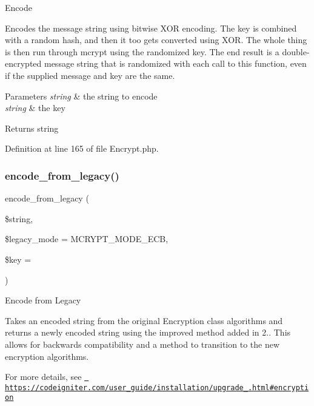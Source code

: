 Encode

Encodes the message string using bitwise X\+OR encoding. The key is combined with a random hash, and then it too gets converted using X\+OR. The whole thing is then run through mcrypt using the randomized key. The end result is a double-\/encrypted message string that is randomized with each call to this function, even if the supplied message and key are the same.


\begin{DoxyParams}{Parameters}
{\em string} & the string to encode \\
\hline
{\em string} & the key \\
\hline
\end{DoxyParams}
\begin{DoxyReturn}{Returns}
string 
\end{DoxyReturn}


Definition at line 165 of file Encrypt.\+php.

\mbox{\label{class_c_i___encrypt_a74e58407a40ff1f3d030a2065cf10182}} 
\subsubsection{\texorpdfstring{encode\_from\_legacy()}{encode\_from\_legacy()}}
{\footnotesize\ttfamily encode\+\_\+from\+\_\+legacy (\begin{DoxyParamCaption}\item[{}]{\$string,  }\item[{}]{\$legacy\+\_\+mode = {\ttfamily MCRYPT\+\_\+MODE\+\_\+ECB},  }\item[{}]{\$key = {\ttfamily \textquotesingle{}\textquotesingle{}} }\end{DoxyParamCaption})}

Encode from Legacy

Takes an encoded string from the original Encryption class algorithms and returns a newly encoded string using the improved method added in 2.. This allows for backwards compatibility and a method to transition to the new encryption algorithms.

For more details, see \href{https://codeigniter.com/user_guide/installation/upgrade_200.html\#encryption}{\texttt{ https\+://codeigniter.\+com/user\+\_\+guide/installation/upgrade\+\_.\+html\#encryption}}


